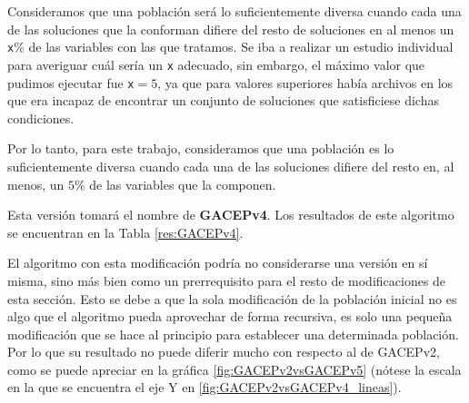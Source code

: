 Consideramos que una población será lo suficientemente diversa cuando cada una de las soluciones que la conforman difiere del resto de soluciones en al menos un \texttt{x}\% de las variables con las que tratamos. 
Se iba a realizar un estudio individual para averiguar cuál sería un \texttt{x} adecuado, sin embargo, el máximo valor que pudimos ejecutar fue \texttt{x}$=5$, ya que para valores superiores había archivos en los que era incapaz de encontrar un conjunto de soluciones que satisficiese dichas condiciones. 

Por lo tanto, para este trabajo, consideramos que una población es lo suficientemente diversa cuando cada una de las soluciones difiere del resto en, al menos, un $5\%$ de las variables que la componen. 

Esta versión tomará el nombre de \textbf{GACEPv4}. 
Los resultados de este algoritmo se encuentran en la Tabla \ref{res:GACEPv4}.

El algoritmo con esta modificación podría no considerarse una versión en sí misma, sino más bien como un prerrequisito para el resto de modificaciones de esta sección. 
Esto se debe a que la sola modificación de la población inicial no es algo que el algoritmo pueda aprovechar de forma recursiva, es solo una pequeña modificación que se hace al principio para establecer una determinada población. 
Por lo que su resultado no puede diferir mucho con respecto al de GACEPv2, como se puede apreciar en la gráfica \ref{fig:GACEPv2vsGACEPv5} (nótese la escala en la que se encuentra el eje Y en \ref{fig:GACEPv2vsGACEPv4_lineas}). 

